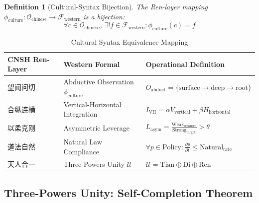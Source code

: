 \documentclass[conference]{IEEEtran}
\newtheorem{definition}{Definition}
\begin{document}
\begin{definition}[Cultural-Syntax Bijection]
The Ren-layer mapping $\phi_{\text{culture}}: \mathcal{O}_{\text{chinese}} \to
\mathcal{F}_{\text{western}}$ is a bijection:
\begin{equation}
  \forall c \in \mathcal{O}_{\text{chinese}},\,
  \exists! f \in \mathcal{F}_{\text{western}}:
  \phi_{\text{culture}}(c) = f
\end{equation}
\end{definition}

\begin{table}[t]
\centering
\caption{Cultural Syntax Equivalence Mapping}
\label{tab:culture}
\renewcommand{\arraystretch}{1.4}
\begin{tabular}{lll}
\toprule
\textbf{CNSH Ren-Layer} & \textbf{Western Formal} & \textbf{Operational Definition} \\
\midrule
望闻问切 & Abductive Observation $\phi_{\text{culture}}$
  & $O_{\text{abduct}} = \{\text{surface} \to \text{deep}
    \to \text{root}\}$ \\
合纵连横 & Vertical-Horizontal Integration
  & $I_{\text{VH}} = \alpha V_{\text{vertical}} +
    \beta H_{\text{horizontal}}$ \\
以柔克刚 & Asymmetric Leverage
  & $L_{\text{asym}} = \frac{\text{Weak}_{\text{resource}}}
    {\text{Strong}_{\text{target}}} > \theta$ \\
道法自然 & Natural Law Compliance
  & $\forall p \in \text{Policy}: \frac{\partial p}{\partial t}
    \leq \text{Natural}_{\text{rate}}$ \\
天人合一 & Three-Powers Unity $\mathcal{U}$
  & $\mathcal{U} = \text{Tian} \oplus \text{Di}
    \oplus \text{Ren}$ \\
\bottomrule
\end{tabular}
\end{table}

\subsection{Three-Powers Unity: Self-Completion Theorem}
\end{document}
